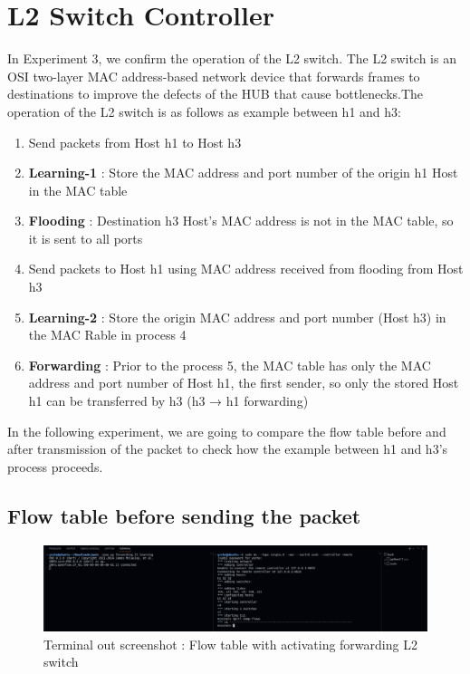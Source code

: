 \section{L2 Switch Controller}
In Experiment 3, we confirm the operation of the L2 switch. The L2 switch is an OSI two-layer MAC address-based network device that forwards frames to destinations to improve the defects of the HUB that cause bottlenecks.The operation of the L2 switch is as follows as example between h1 and h3:
\vspace{-3mm}
\begin{enumerate}
    \item Send packets from Host h1 to Host h3
    \item \textbf{Learning-1} : Store the MAC address and port number of the origin h1 Host in the MAC table
    \item \textbf{Flooding} : Destination h3 Host's MAC address is not in the MAC table, so it is sent to all ports
    \item Send packets to Host h1 using MAC address received from flooding from Host h3
    \item \textbf{Learning-2} : Store the origin MAC address and port number (Host h3) in the MAC Rable in process 4
    \item \textbf{Forwarding} : Prior to the process 5, the MAC table has only the MAC address and port number of Host h1, the first sender, so only the stored Host h1 can be transferred by h3 (h3 → h1 forwarding)
\end{enumerate}
\vspace{-3mm}
In the following experiment, we are going to compare the flow table before and after transmission of the packet to check how the example between h1 and h3's process proceeds.
\vspace{-1.5mm}
\subsection{Flow table before sending the packet}
\vspace{-4mm}
\begin{figure}[!h]\centering 
	\includegraphics[width=.99\textwidth]{image/week06/3-1-1.png}
	\caption{\footnotesize 
	Terminal out screenshot : Flow table with activating forwarding L2 switch}
	\vspace{-10pt}
\end{figure}
\clearpage
